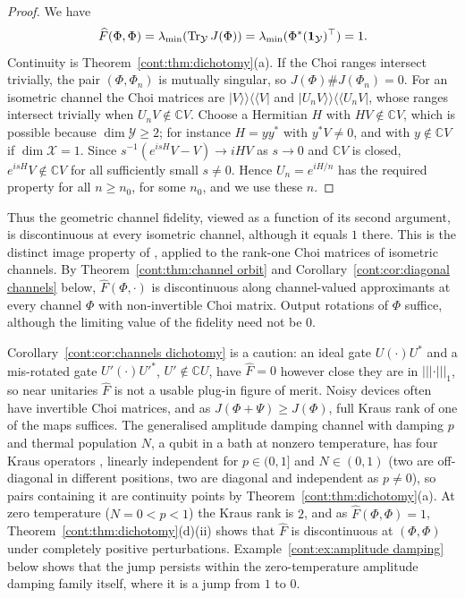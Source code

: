 \begin{proof}
We have
\[
\widehat F(\Phi,\Phi)=\lambda_{\min}(\operatorname{Tr}_{\mathcal{Y}}J(\Phi))=\lambda_{\min}(\Phi^*(\mathbf{1}_{\mathcal{Y}})^\top)=1.
\]
Continuity is Theorem~\ref{cont:thm:dichotomy}(a). If the Choi ranges intersect trivially, the pair $(\Phi,\Phi_n)$ is mutually singular, so $J(\Phi)\#J(\Phi_n)=0$. For an isometric channel the Choi matrices are $|V\rangle\!\rangle\langle\!\langle V|$ and $|U_nV\rangle\!\rangle\langle\!\langle U_nV|$, whose ranges intersect trivially when $U_nV\notin\mathbb{C}V$. Choose a Hermitian $H$ with $HV\notin\mathbb{C}V$, which is possible because $\dim\mathcal{Y}\geq2$; for instance $H=yy^*$ with $y^*V\neq0$, and with $y\notin\mathbb{C}V$ if $\dim\mathcal{X}=1$. Since $s^{-1}(e^{isH}V-V)\to iHV$ as $s\to0$ and $\mathbb{C}V$ is closed, $e^{isH}V\notin\mathbb{C}V$ for all sufficiently small $s\neq0$. Hence $U_n=e^{iH/n}$ has the required property for all $n\geq n_0$, for some $n_0$, and we use these $n$.
\end{proof}

Thus the geometric channel fidelity, viewed as a function of its second argument, is discontinuous at every isometric channel, although it equals $1$ there. This is the distinct image property of \cite{cree2020fidelity}, applied to the rank-one Choi matrices of isometric channels. %
By Theorem~\ref{cont:thm:channel orbit} and Corollary~\ref{cont:cor:diagonal channels} below, $\widehat F(\Phi,\cdot)$ is discontinuous along channel-valued approximants at every channel $\Phi$ with non-invertible Choi matrix. Output rotations of $\Phi$ suffice, although the limiting value of the fidelity need not be $0$.

\begin{remark}\label{cont:rem:phys-dichotomy}
Corollary~\ref{cont:cor:channels dichotomy} is a caution: an ideal gate $U(\cdot)U^*$ and a mis-rotated gate $U'(\cdot)U'^*$, $U'\notin\mathbb{C}U$, have $\widehat{F}=0$ however close they are in $|||\cdot|||_1$, so near unitaries $\widehat{F}$ is not a usable plug-in figure of merit. Noisy devices often have invertible Choi matrices, and as $J(\Phi+\Psi)\geq J(\Phi)$, full Kraus rank of one of the maps suffices. The generalised amplitude damping channel with damping $p$ and thermal population $N$, a qubit in a bath at nonzero temperature, has four Kraus operators \cite{KhatriSharmaWilde2020}, linearly independent for $p\in(0,1]$ and $N\in(0,1)$ (two are off-diagonal in different positions, two are diagonal and independent as $p\neq0$), so pairs containing it are continuity points by Theorem~\ref{cont:thm:dichotomy}(a). At zero temperature ($N=0<p<1$) the Kraus rank is $2$, and as $\widehat{F}(\Phi,\Phi)=1$, Theorem~\ref{cont:thm:dichotomy}(d)(ii) shows that $\widehat{F}$ is discontinuous at $(\Phi,\Phi)$ under completely positive perturbations.
Example~\ref{cont:ex:amplitude damping} below shows that the jump persists within the zero-temperature amplitude damping family itself, where it is a jump from $1$ to $0$. %
\end{remark}

